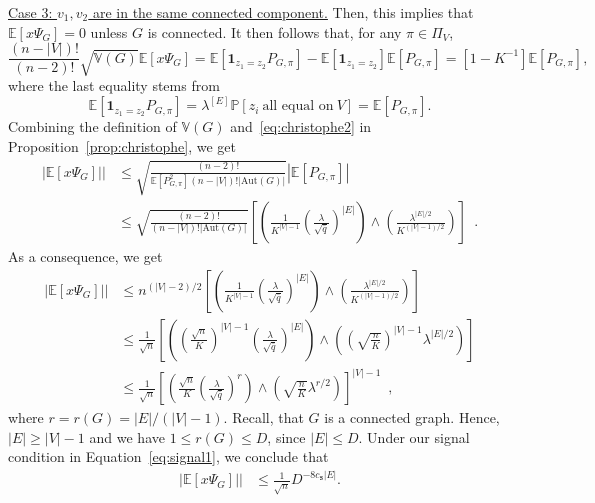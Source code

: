 \documentclass[final]{colt2026}
\newcommand{\1}{\mathbf{1}}
\newcommand{\bbP}{\mathbb{P}}
\newcommand{\cro}[1]{\left[#1\right]}
\begin{document}
\noindent
\underline{Case 3: $v_1,v_2$ are in the same connected component.} Then, this implies that  $\mathbb E[x\Psi_G]=0$ unless $G$ is connected. It then follows that, for any $\pi \in \Pi_V$,
$$\frac{(n-|V|)!}{(n-2)!}\sqrt{\mathbb V(G)}\mathbb E[x\Psi_G] = \mathbb E[\1_{z_1=z_2}P_{G,\pi}] - \mathbb E[\1_{z_1=z_2}] \mathbb E[P_{G,\pi}] =   [1 - K^{-1}]  \mathbb E[P_{G,\pi}],$$
where the last equality stems from 
$$\mathbb E[\1_{z_1=z_2}P_{G,\pi}]=\lambda^{[E]}\bbP\cro{z_{i}\ \text{all equal on}\ V}=\mathbb E[P_{G,\pi}].$$
 Combining the definition of $\mathbb V(G)$ and~\eqref{eq:christophe2} in Proposition~\ref{prop:christophe}, we get 
\begin{align*}
\left|\mathbb E[x\Psi_G]|\right| & \leq   \sqrt{\frac{(n-2)!}{\mathbb E[P_{G,\pi}^2](n-|V|)!|\mathrm{Aut}(G)|}}|\mathbb E[P_{G,\pi}]| \\
& \leq \sqrt{\frac{(n-2)!}{(n-|V|)!|\mathrm{Aut}(G)|}} \left[\left(\frac{1}{K^{|V|-1}} \left(\frac{\lambda}{\sqrt{\bar q}}\right)^{|E|}\right) \land \left(\frac{\lambda^{|E|/2}}{K^{(|V|-1)/2}} \right)\right]\enspace .
\end{align*}
As a consequence, we get 
\begin{align*}
    \left|\mathbb E[x\Psi_G]|\right|     &\leq n^{(|V|-2)/2} \left[\left(\frac{1}{K^{|V|-1}} \left(\frac{\lambda}{\sqrt{\bar q}}\right)^{|E|}\right) \land \left(\frac{\lambda^{|E|/2}}{K^{(|V|-1)/2}} \right)\right]\\
    &\leq   \frac{1}{\sqrt{n}}\left[\left(\left(\frac{\sqrt{n}}{K}\right)^{|V|-1} \left(\frac{\lambda}{\sqrt{\bar q}}\right)^{|E|}\right) \land \left(\left(\sqrt{\frac{n}{K}}\right)^{|V|-1}\lambda^{|E|/2} \right)\right]\\
    &\leq \frac{1}{\sqrt{n}} \left[\left(\frac{\sqrt{n}}{K} \left(\frac{\lambda}{\sqrt{\bar q}}\right)^{r}\right) \land \left(\sqrt{\frac{n}{K}}\lambda^{r/2} \right)\right]^{|V|-1}\enspace ,
\end{align*}
where $r = r(G) = |E|/(|V|-1)$. Recall, that $G$ is a connected graph. Hence, $|E|\geq |V|-1$ and we have $1\leq r(G)\leq D$, since $|E|\leq D$. Under our signal condition in Equation~\eqref{eq:signal1}, we conclude that 
\begin{align*}
    \left|\mathbb E[x\Psi_G]|\right| &\leq \frac{1}{\sqrt{n}} D^{-8c_{\texttt{s}}|E|}.  %
\end{align*}
\medskip 
\end{document}
